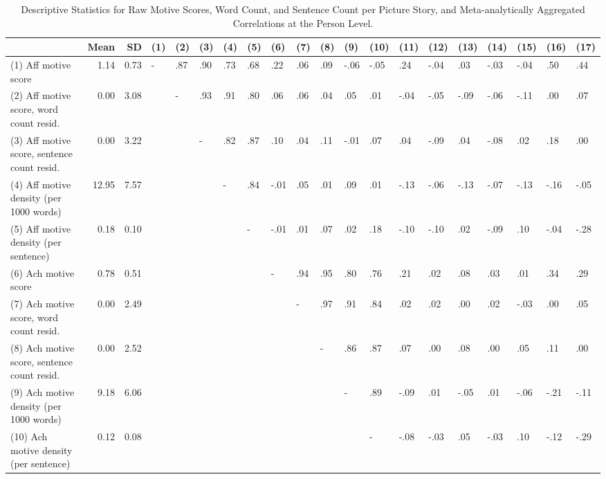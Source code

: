 \documentclass[jou,a4paper]{apa6}\usepackage[]{graphicx}\usepackage[]{color}
\begin{document}
\begin{table}
	\begin{threeparttable}
		\caption{Descriptive Statistics for Raw Motive Scores, Word Count, and Sentence Count per Picture Story, and Meta-analytically Aggregated Correlations at the Person Level.}
		\label{tab:descCor}
		\footnotesize
		\begin{tabularx}{\textwidth}{Xrrlllllllllllllllll}
		\toprule
 & Mean & SD & (1) & (2) & (3) & (4) & (5) & (6) & (7) & (8) & (9) & (10) & (11) & (12) & (13) & (14) & (15) & (16) & (17) \\ 
  \hline
(1) Aff motive score & 1.14 & 0.73 & - & .87 & .90 & .73 & .68 & .22 & .06 & .09 & -.06 & -.05 & .24 & -.04 & .03 & -.03 & -.04 & .50 & .44 \\ 
  (2) Aff motive score, word count resid. & 0.00 & 3.08 &  & - & .93 & .91 & .80 & .06 & .06 & .04 & .05 & .01 & -.04 & -.05 & -.09 & -.06 & -.11 & .00 & .07 \\ 
  (3) Aff motive score, sentence count resid. & 0.00 & 3.22 &  &  & - & .82 & .87 & .10 & .04 & .11 & -.01 & .07 & .04 & -.09 & .04 & -.08 & .02 & .18 & .00 \\ 
  (4) Aff motive density (per 1000 words) & 12.95 & 7.57 &  &  &  & - & .84 & -.01 & .05 & .01 & .09 & .01 & -.13 & -.06 & -.13 & -.07 & -.13 & -.16 & -.05 \\ 
  (5) Aff motive density (per sentence) & 0.18 & 0.10 &  &  &  &  & - & -.01 & .01 & .07 & .02 & .18 & -.10 & -.10 & .02 & -.09 & .10 & -.04 & -.28 \\ 
  (6) Ach motive score & 0.78 & 0.51 &  &  &  &  &  & - & .94 & .95 & .80 & .76 & .21 & .02 & .08 & .03 & .01 & .34 & .29 \\ 
  (7) Ach motive score, word count resid. & 0.00 & 2.49 &  &  &  &  &  &  & - & .97 & .91 & .84 & .02 & .02 & .00 & .02 & -.03 & .00 & .05 \\ 
  (8) Ach motive score, sentence count resid. & 0.00 & 2.52 &  &  &  &  &  &  &  & - & .86 & .87 & .07 & .00 & .08 & .00 & .05 & .11 & .00 \\ 
  (9) Ach motive density (per 1000 words) & 9.18 & 6.06 &  &  &  &  &  &  &  &  & - & .89 & -.09 & .01 & -.05 & .01 & -.06 & -.21 & -.11 \\ 
  (10) Ach motive density (per sentence) & 0.12 & 0.08 &  &  &  &  &  &  &  &  &  & - & -.08 & -.03 & .05 & -.03 & .10 & -.12 & -.29 \\ 

\end{tabularx}
\end{threeparttable}
\end{table}
\end{document}
